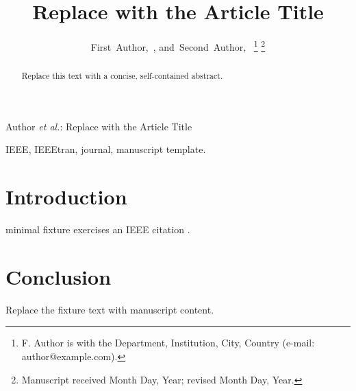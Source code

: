 \documentclass[journal]{IEEEtran}
\begin{document}
\title{Replace with the Article Title}

\author{First~Author,~,
        and~Second~Author,~%
\thanks{F. Author is with the Department, Institution, City, Country
(e-mail: author@example.com).}%
\thanks{Manuscript received Month Day, Year; revised Month Day, Year.}}

%
{Author \MakeLowercase{\textit{et al.}}: Replace with the Article Title}

\maketitle

\begin{abstract}
Replace this text with a concise, self-contained abstract.
\end{abstract}

\begin{IEEEkeywords}
IEEE, IEEEtran, journal, manuscript template.
\end{IEEEkeywords}

\IEEEpeerreviewmaketitle

\section{Introduction}
 minimal fixture exercises an IEEE citation \cite{lamport1994latex}.

\section{Conclusion}
Replace the fixture text with manuscript content.



\end{document}
